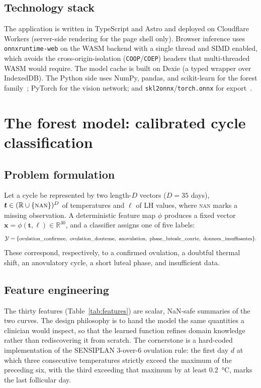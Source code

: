 \documentclass[11pt,a4paper]{article}
\newcommand{\code}[1]{\texttt{\small #1}}
\begin{document}
\subsection{Technology stack}
The application is written in TypeScript and Astro and deployed on Cloudflare
Workers (server-side rendering for the page shell only). Browser inference uses
\code{onnxruntime-web} on the WASM backend with a single thread and SIMD enabled,
which avoids the cross-origin-isolation (\code{COOP}/\code{COEP}) headers that
multi-threaded WASM would require. The model cache is built on Dexie (a typed
wrapper over IndexedDB). The Python side uses NumPy, pandas, and scikit-learn for
the forest family~\cite{pedregosa2011scikit}; PyTorch for the vision network;
and \code{skl2onnx}/\code{torch.onnx} for export~\cite{onnx2017,skl2onnx}.

\section{The forest model: calibrated cycle classification}
\label{sec:forest}

\subsection{Problem formulation}
Let a cycle be represented by two length-$D$ vectors ($D = 35$ days),
$\bm{t} \in (\mathbb{R}\cup\{\textsc{nan}\})^{D}$ of temperatures and
$\bm{\ell}$ of LH values, where \textsc{nan} marks a missing observation. A
deterministic feature map $\phi$ produces a fixed vector
$\bm{x} = \phi(\bm{t},\bm{\ell}) \in \mathbb{R}^{30}$, and a classifier assigns
one of five labels:
\[
\mathcal{Y} = \{
\text{\small ovulation\_confirmee},\
\text{\small ovulation\_douteuse},\
\text{\small anovulation},\
\text{\small phase\_luteale\_courte},\
\text{\small donnees\_insuffisantes}
\}.
\]
These correspond, respectively, to a confirmed ovulation, a doubtful thermal
shift, an anovulatory cycle, a short luteal phase, and insufficient data.

\subsection{Feature engineering}
\label{sec:features}
The thirty features (Table~\ref{tab:features}) are scalar, NaN-safe summaries
of the two curves. The design philosophy is to hand the model the same
quantities a clinician would inspect, so that the learned function refines
domain knowledge rather than rediscovering it from scratch. The cornerstone
is a hard-coded implementation of the SENSIPLAN 3-over-6 ovulation rule: the
first day $d$ at which three consecutive temperatures strictly exceed the
maximum of the preceding six, with the third exceeding that maximum by at
least \SI{0.2}{\celsius}, marks the last follicular day.
\end{document}
